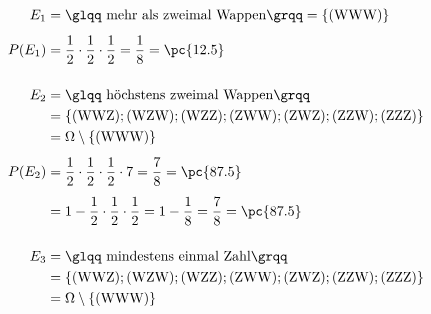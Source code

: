 \begin{exercise}
\begin{center}
    \end{center}
    \begin{equation*}
      \begin{split}
        E_1&=\text{\glqq mehr als zweimal Wappen\grqq}
        =\{(\text{WWW})\}
        \\[1ex]
        P(E_1)&=\frac{1}{2}\cdot\frac{1}{2}\cdot\frac{1}{2}
        =\frac{1}{8}
        =\pc{12.5}
        \\[3ex]
        E_2&=\text{\glqq höchstens zweimal Wappen\grqq}
        \\
        &=\{
          (\text{WWZ});
          (\text{WZW});
          (\text{WZZ});
          (\text{ZWW});
          (\text{ZWZ});
          (\text{ZZW});
          (\text{ZZZ})
         \}
        \\
        &=\Omega\setminus\{(\text{WWW})\}
        \\[1ex]
        P(E_2)&=\frac{1}{2}\cdot\frac{1}{2}\cdot\frac{1}{2}\cdot7
        =\frac{7}{8}
        =\pc{87.5}
        \\[1ex]
        &=1-\frac{1}{2}\cdot\frac{1}{2}\cdot\frac{1}{2}
        =1-\frac{1}{8}
        =\frac{7}{8}
        =\pc{87.5}
        \\[3ex]
        E_3&=\text{\glqq mindestens einmal Zahl\grqq}
        \\
        &=\{
          (\text{WWZ});
          (\text{WZW});
          (\text{WZZ});
          (\text{ZWW});
          (\text{ZWZ});
          (\text{ZZW});
          (\text{ZZZ})
         \}
        \\
        &=\Omega\setminus\{(\text{WWW})\}
        \\[1ex]

\end{split}
\end{equation*}
\end{exercise}
